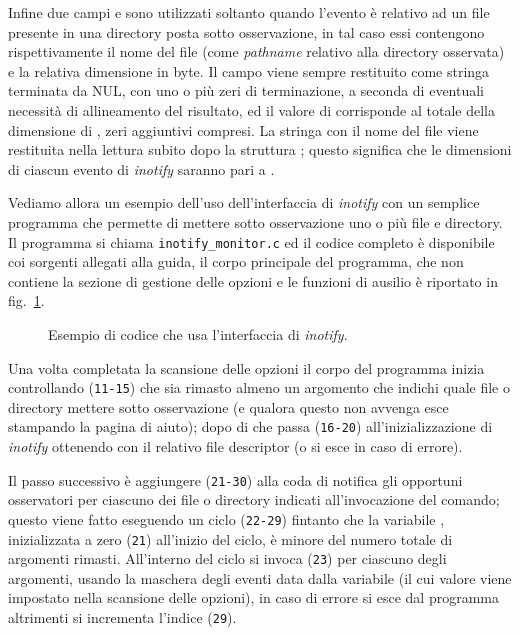 Infine due campi  e  sono utilizzati soltanto quando
l'evento è relativo ad un file presente in una directory posta sotto
osservazione, in tal caso essi contengono rispettivamente il nome del file
(come \textit{pathname} relativo alla directory osservata) e la relativa
dimensione in byte. Il campo  viene sempre restituito come stringa
terminata da NUL, con uno o più zeri di terminazione, a seconda di eventuali
necessità di allineamento del risultato, ed il valore di  corrisponde
al totale della dimensione di , zeri aggiuntivi compresi. La stringa
con il nome del file viene restituita nella lettura subito dopo la struttura
; questo significa che le dimensioni di ciascun evento
di \textit{inotify} saranno pari a .

Vediamo allora un esempio dell'uso dell'interfaccia di \textit{inotify} con un
semplice programma che permette di mettere sotto osservazione uno o più file e
directory. Il programma si chiama \texttt{inotify\_monitor.c} ed il codice
completo è disponibile coi sorgenti allegati alla guida, il corpo principale
del programma, che non contiene la sezione di gestione delle opzioni e le
funzioni di ausilio è riportato in fig.~\ref{fig:inotify_monitor_example}.

\begin{figure}[!htbp]
  \footnotesize \centering
  \begin{minipage}[c]{\codesamplewidth}
  \end{minipage}
  \normalsize
  \caption{Esempio di codice che usa l'interfaccia di \textit{inotify}.}
  \label{fig:inotify_monitor_example}
\end{figure}

Una volta completata la scansione delle opzioni il corpo del programma inizia
controllando (\texttt{\small 11-15}) che sia rimasto almeno un argomento che
indichi quale file o directory mettere sotto osservazione (e qualora questo
non avvenga esce stampando la pagina di aiuto); dopo di che passa
(\texttt{\small 16-20}) all'inizializzazione di \textit{inotify} ottenendo con
 il relativo file descriptor (o si esce in caso di
errore).

Il passo successivo è aggiungere (\texttt{\small 21-30}) alla coda di
notifica gli opportuni osservatori per ciascuno dei file o directory indicati
all'invocazione del comando; questo viene fatto eseguendo un ciclo
(\texttt{\small 22-29}) fintanto che la variabile , inizializzata a
zero (\texttt{\small 21}) all'inizio del ciclo, è minore del numero totale di
argomenti rimasti. All'interno del ciclo si invoca (\texttt{\small 23})
 per ciascuno degli argomenti, usando la maschera
degli eventi data dalla variabile  (il cui valore viene impostato
nella scansione delle opzioni), in caso di errore si esce dal programma
altrimenti si incrementa l'indice (\texttt{\small 29}).

